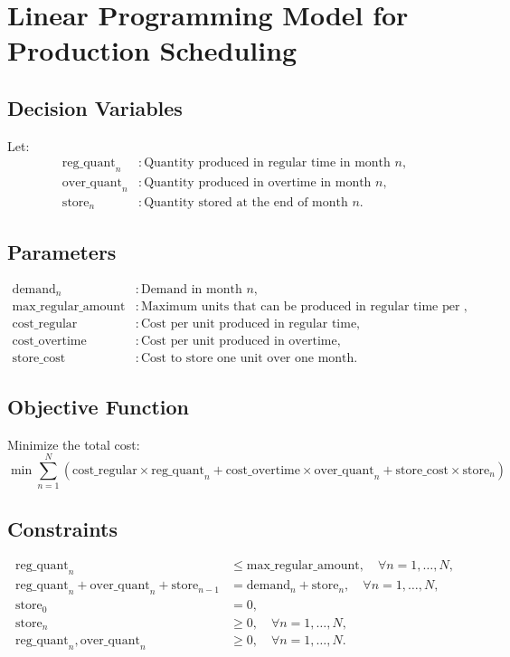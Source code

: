\documentclass{article}
\begin{document}
\section*{Linear Programming Model for Production Scheduling}

\subsection*{Decision Variables}
Let:
\begin{align*}
    \text{reg\_quant}_n & : \text{Quantity produced in regular time in month } n, \\
    \text{over\_quant}_n & : \text{Quantity produced in overtime in month } n, \\
    \text{store}_n & : \text{Quantity stored at the end of month } n.
\end{align*}

\subsection*{Parameters}
\begin{align*}
    \text{demand}_n & : \text{Demand in month } n, \\
    \text{max\_regular\_amount} & : \text{Maximum units that can be produced in regular time per month}, \\
    \text{cost\_regular} & : \text{Cost per unit produced in regular time}, \\
    \text{cost\_overtime} & : \text{Cost per unit produced in overtime}, \\
    \text{store\_cost} & : \text{Cost to store one unit over one month}.
\end{align*}

\subsection*{Objective Function}
Minimize the total cost:
\[
\min \sum_{n=1}^{N} \left( \text{cost\_regular} \times \text{reg\_quant}_n + \text{cost\_overtime} \times \text{over\_quant}_n + \text{store\_cost} \times \text{store}_n \right)
\]

\subsection*{Constraints}
\begin{align*}
    \text{reg\_quant}_n & \leq \text{max\_regular\_amount}, \quad \forall n = 1, \ldots, N, \\
    \text{reg\_quant}_n + \text{over\_quant}_n + \text{store}_{n-1} & = \text{demand}_n + \text{store}_n, \quad \forall n = 1, \ldots, N, \\
    \text{store}_0 & = 0, \\
    \text{store}_n & \geq 0, \quad \forall n = 1, \ldots, N, \\
    \text{reg\_quant}_n, \text{over\_quant}_n & \geq 0, \quad \forall n = 1, \ldots, N.
\end{align*}
\end{document}
